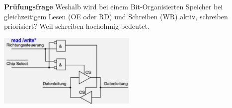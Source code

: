\textbf{Prüfungsfrage}\newline
Weshalb wird bei einem Bit-Organisierten Speicher bei gleichzeitigem Lesen (OE oder RD) und Schreiben (WR) aktiv, schreiben priorisiert?\newline
Weil schreiben hochohmig bedeutet.
\begin{minipage}{0.5\linewidth}
    \includegraphics[width=0.5\textwidth]{images/SystembusSpeicherSpeichersystem/SpeicherSysDirectMemPrue}
\end{minipage}

